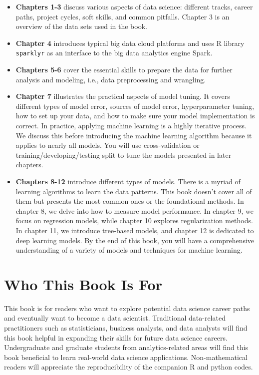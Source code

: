 \documentclass[
  12pt,
]{krantz}
\providecommand{\tightlist}{%
  \setlength{\itemsep}{0pt}\setlength{\parskip}{0pt}}
\begin{document}
\begin{itemize}
\tightlist
\item
  \textbf{Chapters 1-3} discuss various aspects of data science: different tracks, career paths, project cycles, soft skills, and common pitfalls. Chapter 3 is an overview of the data sets used in the book.
\item
  \textbf{Chapter 4} introduces typical big data cloud platforms and uses R library \texttt{sparklyr}  as an interface to the big data analytics engine Spark.
\item
  \textbf{Chapters 5-6} cover the essential skills to prepare the data for further analysis and modeling, i.e., data preprocessing and wrangling.
\item
  \textbf{Chapter 7} illustrates the practical aspects of model tuning. It covers different types of model error, sources of model error, hyperparameter tuning, how to set up your data, and how to make sure your model implementation is correct. In practice, applying machine learning is a highly iterative process. We discuss this before introducing the machine learning algorithm because it applies to nearly all models. You will use cross-validation or training/developing/testing split to tune the models presented in later chapters.
\item
  \textbf{Chapters 8-12} introduce different types of models. There is a myriad of learning algorithms to learn the data patterns. This book doesn't cover all of them but presents the most common ones or the foundational methods. In chapter 8, we delve into how to measure model performance. In chapter 9, we focus on regression models, while chapter 10 explores regularization methods. In chapter 11, we introduce tree-based models, and chapter 12 is dedicated to deep learning models. By the end of this book, you will have a comprehensive understanding of a variety of models and techniques for machine learning.
\end{itemize}

\hypertarget{who-this-book-is-for}{%
\section*{Who This Book Is For}\label{who-this-book-is-for}}


This book is for readers who want to explore potential data science career paths and eventually want to become a data scientist. Traditional data-related practitioners such as statisticians, business analysts, and data analysts will find this book helpful in expanding their skills for future data science careers. Undergraduate and graduate students from analytics-related areas will find this book beneficial to learn real-world data science applications. Non-mathematical readers will appreciate the reproducibility of the companion R and python codes.
\end{document}
